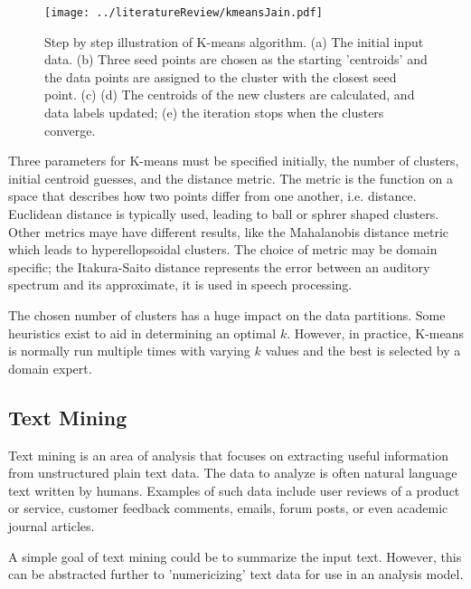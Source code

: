 \documentclass[12pt]{article}
\begin{document}
\begin{doublespacing}
\begin{figure}[!hb]
    \centering
    \texttt{[image: ../literatureReview/kmeansJain.pdf]}
    \caption{Step by step illustration of K-means algorithm. (a) The initial input data. (b) Three seed points are chosen as the starting 'centroids' and the data points are assigned to the cluster with the closest seed point. (c) (d) The centroids of the new clusters are calculated, and data labels updated; (e) the iteration stops when the clusters converge.}
    \label{fig:K-Means-Jain}
\end{figure}

Three parameters for K-means must be specified initially, the number of clusters, initial centroid guesses, and the distance metric.
The metric is the function on a space that describes how two points differ from one another, i.e. distance.
Euclidean distance is typically used, leading to ball or sphrer shaped clusters. \citep{Jain2010651}
Other metrics maye have different results, like the Mahalanobis distance metric which leads to hyperellopsoidal clusters. \citep{MaoJain1996}
The choice of metric may be domain specific; the Itakura-Saito distance represents the error between an auditory spectrum and its approximate, it is used in speech processing. \citep{chan2008advances}

The chosen number of clusters has a huge impact on the data partitions.
Some heuristics exist to aid in determining an optimal $k$. \citep{tibshirani2001estimating}
However, in practice, K-means is normally run multiple times with varying $k$ values and the best is selected by a domain expert.



\subsection{Text Mining}
Text mining is an area of analysis that focuses on extracting useful information from unstructured plain text data.
The data to analyze is often natural language text written by humans.
Examples of such data include user reviews of a product or service, customer feedback comments, emails, forum posts, or even academic journal articles.

A simple goal of text mining could be to summarize the input text.
However, this can be abstracted further to 'numericizing' text data for use in an analysis model.


\end{doublespacing}
\end{document}
